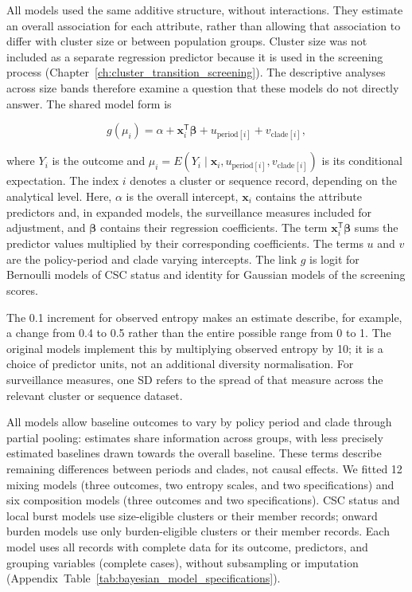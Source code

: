 All models used the same additive structure, without interactions. They estimate an overall association for each attribute, rather than allowing that association to differ with cluster size or between population groups. Cluster size was not included as a separate regression predictor because it is used in the screening process (Chapter~\ref{ch:cluster_transition_screening}). The descriptive analyses across size bands therefore examine a question that these models do not directly answer. The shared model form is

\[
    g(\mu_i)=\alpha+\mathbf{x}_i^{\mathsf T}\boldsymbol{\beta}
    +u_{\mathrm{period}[i]}+v_{\mathrm{clade}[i]},
\]

where $Y_i$ is the outcome and $\mu_i=E(Y_i\mid\mathbf{x}_i,u_{\mathrm{period}[i]},v_{\mathrm{clade}[i]})$ is its conditional expectation. The index $i$ denotes a cluster or sequence record, depending on the analytical level. Here, $\alpha$ is the overall intercept, $\mathbf{x}_i$ contains the attribute predictors and, in expanded models, the surveillance measures included for adjustment, and $\boldsymbol{\beta}$ contains their regression coefficients. The term $\mathbf{x}_i^{\mathsf T}\boldsymbol{\beta}$ sums the predictor values multiplied by their corresponding coefficients. The terms $u$ and $v$ are the policy-period and clade varying intercepts. The link $g$ is logit for Bernoulli models of CSC status and identity for Gaussian models of the screening scores.

The 0.1 increment for observed entropy makes an estimate describe, for example, a change from 0.4 to 0.5 rather than the entire possible range from 0 to 1. The original models implement this by multiplying observed entropy by 10; it is a choice of predictor units, not an additional diversity normalisation. For surveillance measures, one SD refers to the spread of that measure across the relevant cluster or sequence dataset.

All models allow baseline outcomes to vary by policy period and clade through partial pooling: estimates share information across groups, with less precisely estimated baselines drawn towards the overall baseline. These terms describe remaining differences between periods and clades, not causal effects. We fitted 12 mixing models (three outcomes, two entropy scales, and two specifications) and six composition models (three outcomes and two specifications). CSC status and local burst models use size-eligible clusters or their member records; onward burden models use only burden-eligible clusters or their member records. Each model uses all records with complete data for its outcome, predictors, and grouping variables (complete cases), without subsampling or imputation (Appendix~Table~\ref{tab:bayesian_model_specifications}).

